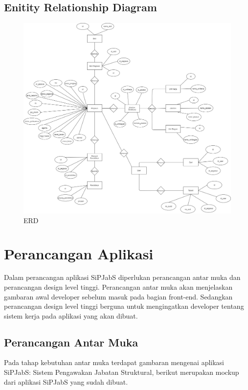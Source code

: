 \subsection{Enitity Relationship Diagram}

\begin{figure}
	\centering
	\includegraphics[width=1\textwidth]
	{pics/diagram/erd.png}
	\caption{ERD}
	\label{fig:32}
\end{figure}

\section{Perancangan Aplikasi}
Dalam perancangan aplikasi SiPJabS diperlukan perancangan antar muka dan perancangan design level tinggi. Perancangan antar muka akan menjelaskan gambaran awal  developer sebelum masuk pada bagian front-end.  Sedangkan perancangan design level tinggi berguna untuk mengingatkan developer tentang sistem kerja pada aplikasi yang akan dibuat.


\subsection{Perancangan Antar Muka}
Pada tahap kebutuhan antar muka terdapat gambaran mengenai aplikasi SiPJabS: Sistem Pengawakan Jabatan Struktural, berikut merupakan mockup dari aplikasi SiPJabS yang sudah dibuat.

